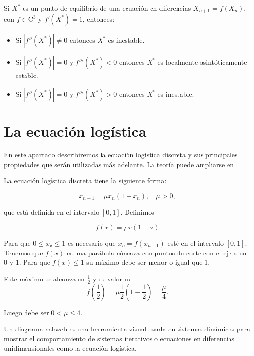 \begin{proposition}
Si $X^*$ es un punto de equilibrio de una ecuación en diferencias $X_{n+1}=f(X_n)$, con $f\in\text{C}^3$ y $f'(X^*)=1$, entonces:
\begin{itemize}
\item Si $|f''(X^*)|\neq 0$ entonces $X^*$ es inestable.
\item Si $|f''(X^*)|=0$ y $f'''(X^*)<0$ entonces $X^*$ es localmente asintóticamente estable.
\item Si $|f''(X^*)|=0$ y $f'''(X^*)>0$ entonces $X^*$ es inestable.
\end{itemize}
\end{proposition}



\section{La ecuación logística}

En este apartado describiremos la ecuación logística discreta y sus principales propiedades que serán utilizadas más adelante. La teoría puede ampliarse en \cite{strogatzNonlinearDynamicsChaos1994}.

\begin{definition}
La ecuación logística discreta tiene la siguiente forma:

$$x_{n+1} = \mu x_n(1-x_n),\quad \mu > 0,$$

que está definida en el intervalo $ [ 0, 1 ] $. Definimos

$$f(x)=\mu x(1-x)$$

Para que $0\leq x_n\leq 1$ es necesario que $x_n=f(x_{n-1})$ esté en el intervalo $[0,1]$. Tenemos que $f(x)$ es una parábola cóncava con puntos de corte con el eje x en $0$ y $1$. Para que $f(x)\leq 1$ su máximo debe ser menor o igual que $1$.

Este máximo se alcanza en $\frac{1}{2}$ y su valor es
$$f\left(\frac{1}{2}\right) = \mu \frac{1}{2}\left(1-\frac{1}{2}\right) = \frac{\mu}{4}.$$

Luego debe ser $0< \mu \leq 4$.

\end{definition}

\begin{definition}
Un diagrama cobweb es una herramienta visual usada en sistemas dinámicos para mostrar el comportamiento de sistemas iterativos o ecuaciones en diferencias unidimensionales como la ecuación logística.
\end{definition}


